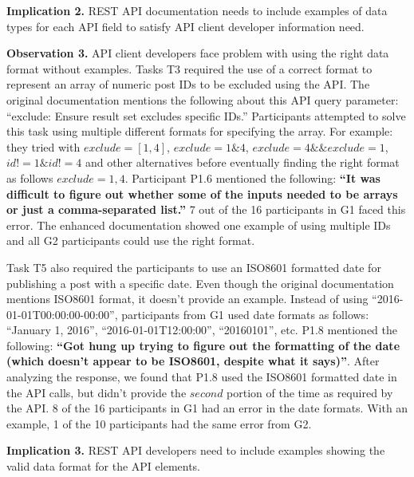 \documentclass[conference]{IEEEtran}
\begin{document}
\textbf{Implication 2.} REST API documentation needs to include examples of data types for each API field to satisfy API client developer information need.

\textbf{Observation 3.} API client developers face problem with using the right data format without examples. Tasks T3 required the use of a correct format to represent an array of numeric post IDs to be excluded using the API. The original documentation mentions the following about this API query parameter: ``exclude: Ensure result set excludes specific IDs.'' Participants attempted to solve this task using multiple different formats for specifying the array. For example: they tried with $exclude=[1,4]$, $exclude=1\&4$, $exclude=4\&\&exclude=1$, $id!=1\&id!=4$ and other alternatives before eventually finding the right format as follows $exclude=1,4$. Participant P1.6 mentioned the following: \textbf{``It was difficult to figure out whether some of the inputs needed to be arrays or just a comma-separated list.''} 7 out of the 16 participants in G1 faced this error. The enhanced documentation showed one example of using multiple IDs and all G2 participants could use the right format.

Task T5 also required the participants to use an ISO8601 formatted date for publishing a post with a specific date. Even though the original documentation mentions ISO8601 format, it doesn't provide an example. Instead of using ``2016-01-01T00:00:00-00:00'', participants from G1 used date formats as follows: ``January 1, 2016'', ``2016-01-01T12:00:00'', ``20160101'', etc. P1.8 mentioned the following: \textbf{``Got hung up trying to figure out the formatting of the date (which doesn't appear to be ISO8601, despite what it says)''}. After analyzing the response, we found that P1.8 used the ISO8601 formatted date in the API calls, but didn't provide the $second$ portion of the time as required by the API. 8 of the 16 participants in G1 had an error in the date formats. With an example, 1 of the 10 participants had the same error from G2.

\textbf{Implication 3.} REST API developers need to include examples showing the valid data format for the API elements.
\end{document}
